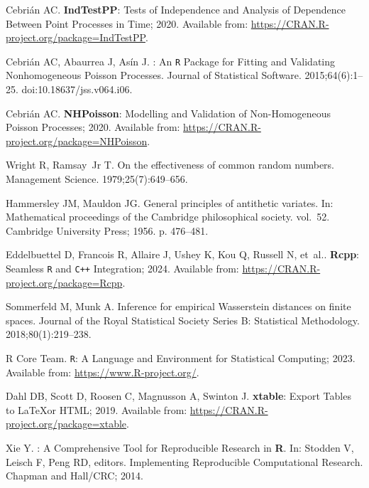 \documentclass[10pt,letterpaper]{article}
\newcommand{\pkg}[1]{{\bf #1}}
\newcommand{\proglang}[1]{\texttt{#1}}
\begin{document}
\begin{thebibliography}{10}
Cebrián AC. \pkg{IndTestPP}: {T}ests of Independence and Analysis of Dependence Between Point Processes in Time; 2020.
\newblock Available from: \url{https://CRAN.R-project.org/package=IndTestPP}.

Cebrián AC, Abaurrea J, Asín J.
\newblock \pkg{NHPoisson}: {A}n \proglang{R} Package for Fitting and Validating Nonhomogeneous Poisson Processes.
\newblock Journal of Statistical Software. 2015;64(6):1–25.
\newblock doi:{10.18637/jss.v064.i06}.

Cebrián AC. \pkg{NHPoisson}: {M}odelling and Validation of Non-Homogeneous Poisson Processes; 2020.
\newblock Available from: \url{https://CRAN.R-project.org/package=NHPoisson}.

Wright R, Ramsay~Jr T.
\newblock On the effectiveness of common random numbers.
\newblock Management Science. 1979;25(7):649--656.

Hammersley JM, Mauldon JG.
\newblock General principles of antithetic variates.
\newblock In: Mathematical proceedings of the Cambridge philosophical society. vol.~52. Cambridge University Press; 1956. p. 476--481.

Eddelbuettel D, Francois R, Allaire J, Ushey K, Kou Q, Russell N, et~al.. \pkg{Rcpp}: Seamless \proglang{R} and \proglang{C++} Integration; 2024.
\newblock Available from: \url{https://CRAN.R-project.org/package=Rcpp}.

Sommerfeld M, Munk A.
\newblock Inference for empirical Wasserstein distances on finite spaces.
\newblock Journal of the Royal Statistical Society Series B: Statistical Methodology. 2018;80(1):219--238.

{R Core Team}. \proglang{R}: {A} Language and Environment for Statistical Computing; 2023.
\newblock Available from: \url{https://www.R-project.org/}.

Dahl DB, Scott D, Roosen C, Magnusson A, Swinton J. \pkg{xtable}: {E}xport Tables to \LaTeX or HTML; 2019.
\newblock Available from: \url{https://CRAN.R-project.org/package=xtable}.

Xie Y.
\newblock \pkg{knitr}: {A} Comprehensive Tool for Reproducible Research in \pkg{R}.
\newblock In: Stodden V, Leisch F, Peng RD, editors. Implementing Reproducible Computational Research. Chapman and Hall/CRC; 2014.


\end{thebibliography}
\end{document}
